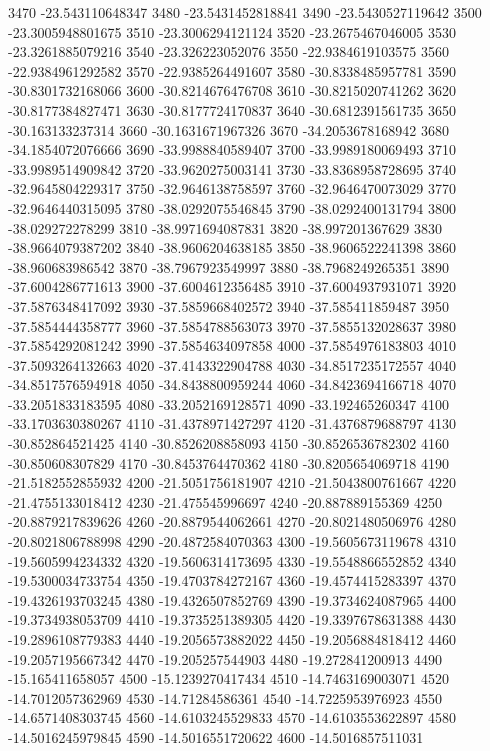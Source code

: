 {3470 -23.543110648347
3480 -23.5431452818841
3490 -23.5430527119642
3500 -23.3005948801675
3510 -23.3006294121124
3520 -23.2675467046005
3530 -23.3261885079216
3540 -23.326223052076
3550 -22.9384619103575
3560 -22.9384961292582
3570 -22.9385264491607
3580 -30.8338485957781
3590 -30.8301732168066
3600 -30.8214676476708
3610 -30.8215020741262
3620 -30.8177384827471
3630 -30.8177724170837
3640 -30.6812391561735
3650 -30.163133237314
3660 -30.1631671967326
3670 -34.2053678168942
3680 -34.1854072076666
3690 -33.9988840589407
3700 -33.9989180069493
3710 -33.9989514909842
3720 -33.9620275003141
3730 -33.8368958728695
3740 -32.9645804229317
3750 -32.9646138758597
3760 -32.9646470073029
3770 -32.9646440315095
3780 -38.0292075546845
3790 -38.0292400131794
3800 -38.029272278299
3810 -38.9971694087831
3820 -38.997201367629
3830 -38.9664079387202
3840 -38.9606204638185
3850 -38.9606522241398
3860 -38.960683986542
3870 -38.7967923549997
3880 -38.7968249265351
3890 -37.6004286771613
3900 -37.6004612356485
3910 -37.6004937931071
3920 -37.5876348417092
3930 -37.5859668402572
3940 -37.585411859487
3950 -37.5854444358777
3960 -37.5854788563073
3970 -37.5855132028637
3980 -37.5854292081242
3990 -37.5854634097858
4000 -37.5854976183803
4010 -37.5093264132663
4020 -37.4143322904788
4030 -34.8517235172557
4040 -34.8517576594918
4050 -34.8438800959244
4060 -34.8423694166718
4070 -33.2051833183595
4080 -33.2052169128571
4090 -33.192465260347
4100 -33.1703630380267
4110 -31.4378971427297
4120 -31.4376879688797
4130 -30.852864521425
4140 -30.8526208858093
4150 -30.8526536782302
4160 -30.850608307829
4170 -30.8453764470362
4180 -30.8205654069718
4190 -21.5182552855932
4200 -21.5051756181907
4210 -21.5043800761667
4220 -21.4755133018412
4230 -21.475545996697
4240 -20.887889155369
4250 -20.8879217839626
4260 -20.8879544062661
4270 -20.8021480506976
4280 -20.8021806788998
4290 -20.4872584070363
4300 -19.5605673119678
4310 -19.5605994234332
4320 -19.5606314173695
4330 -19.5548866552852
4340 -19.5300034733754
4350 -19.4703784272167
4360 -19.4574415283397
4370 -19.4326193703245
4380 -19.4326507852769
4390 -19.3734624087965
4400 -19.3734938053709
4410 -19.3735251389305
4420 -19.3397678631388
4430 -19.2896108779383
4440 -19.2056573882022
4450 -19.2056884818412
4460 -19.2057195667342
4470 -19.205257544903
4480 -19.272841200913
4490 -15.165411658057
4500 -15.1239270417434
4510 -14.7463169003071
4520 -14.7012057362969
4530 -14.71284586361
4540 -14.7225953976923
4550 -14.6571408303745
4560 -14.6103245529833
4570 -14.6103553622897
4580 -14.5016245979845
4590 -14.5016551720622
4600 -14.5016857511031
}
